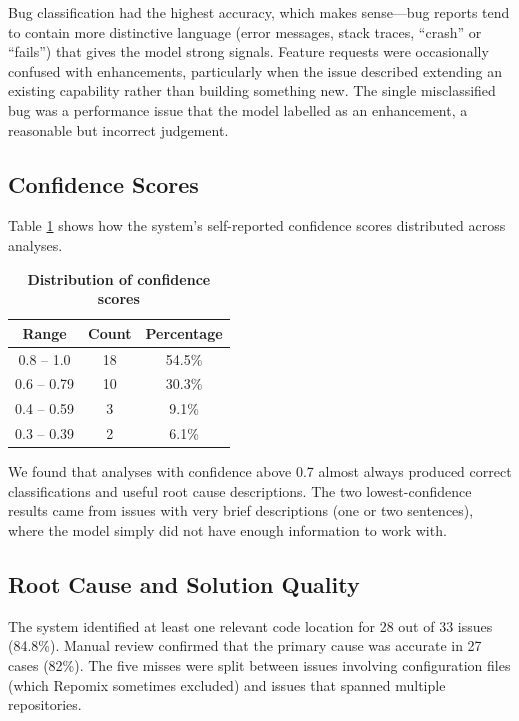 Bug classification had the highest accuracy, which makes sense---bug reports tend to contain more distinctive language (error messages, stack traces, ``crash'' or ``fails'') that gives the model strong signals. Feature requests were occasionally confused with enhancements, particularly when the issue described extending an existing capability rather than building something new. The single misclassified bug was a performance issue that the model labelled as an enhancement, a reasonable but incorrect judgement.

\subsection{Confidence Scores}
Table \ref{tab:confidence} shows how the system's self-reported confidence scores distributed across analyses.

\begin{table}[htb]
\centering
\renewcommand{\arraystretch}{1.3}
\setlength{\arrayrulewidth}{0.5mm}
\fontsize{10}{12}\selectfont
\caption[Distribution of confidence scores]{\textbf{Distribution of confidence scores}}
\vspace{2mm}
\label{tab:confidence}
\begin{tabular}{|c|c|c|}
\hline
\textbf{Range} & \textbf{Count} & \textbf{Percentage} \\
\hline
0.8 -- 1.0 & 18 & 54.5\% \\
\hline
0.6 -- 0.79 & 10 & 30.3\% \\
\hline
0.4 -- 0.59 & 3 & 9.1\% \\
\hline
0.3 -- 0.39 & 2 & 6.1\% \\
\hline
\end{tabular}
\end{table}

We found that analyses with confidence above 0.7 almost always produced correct classifications and useful root cause descriptions. The two lowest-confidence results came from issues with very brief descriptions (one or two sentences), where the model simply did not have enough information to work with.

\subsection{Root Cause and Solution Quality}
The system identified at least one relevant code location for 28 out of 33 issues (84.8\%). Manual review confirmed that the primary cause was accurate in 27 cases (82\%). The five misses were split between issues involving configuration files (which Repomix sometimes excluded) and issues that spanned multiple repositories.

